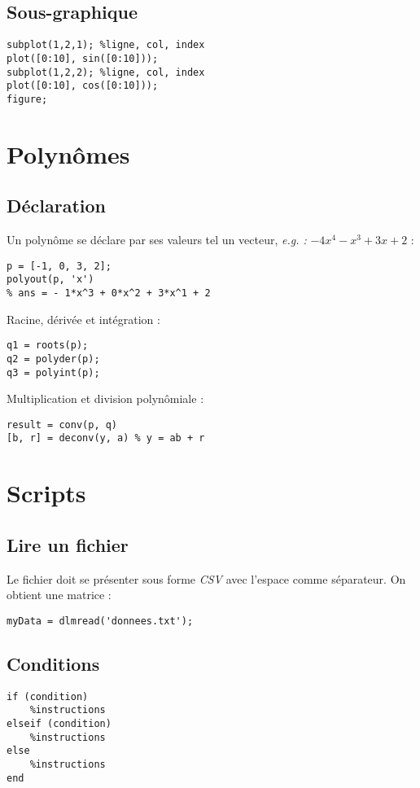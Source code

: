         \subsection{Sous-graphique}
            \begin{lstlisting}
subplot(1,2,1); %ligne, col, index
plot([0:10], sin([0:10]));
subplot(1,2,2); %ligne, col, index
plot([0:10], cos([0:10]));
figure;
            \end{lstlisting}

    \section{Polynômes}
        \subsection{Déclaration}
            Un polynôme se déclare par ses valeurs tel un vecteur,
            \textit{e.g. :} $-4x^4 -x^3 + 3x + 2$ :
            \begin{lstlisting}
p = [-1, 0, 3, 2];
polyout(p, 'x')
% ans = - 1*x^3 + 0*x^2 + 3*x^1 + 2
            \end{lstlisting}
            Racine, dérivée et intégration :
            \begin{lstlisting}
q1 = roots(p);
q2 = polyder(p);
q3 = polyint(p);
            \end{lstlisting}
            Multiplication et division polynômiale :
            \begin{lstlisting}
result = conv(p, q)
[b, r] = deconv(y, a) % y = ab + r
            \end{lstlisting}
    \section{Scripts}
        \subsection{Lire un fichier}
            Le fichier doit se présenter sous forme \textit{CSV} avec l'espace comme séparateur. On obtient une matrice :
            \begin{lstlisting}
myData = dlmread('donnees.txt');
            \end{lstlisting}
        \subsection{Conditions}
            \begin{lstlisting}
if (condition)
	%instructions
elseif (condition)
	%instructions
else
	%instructions
end
            \end{lstlisting}
